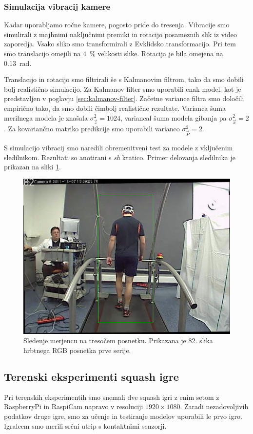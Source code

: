 \subsubsection{Simulacija vibracij kamere}
Kadar uporabljamo ročne kamere, pogosto pride do tresenja. Vibracije smo simulirali z majhnimi naključnimi premiki in rotacijo posameznih slik iz video zaporedja. Vsako sliko smo transformirali z Evklidsko transformacijo. Pri tem smo translacijo omejili na \SI{4}{\%} velikosti slike. Rotacija je bila omejena na \SI{0.13}{rad}. 

Translacijo in rotacijo smo filtrirali še s Kalmanovim filtrom, tako da smo dobili bolj realistično simulacijo. Za Kalmanov filter smo uporabili enak model, kot je predstavljen v poglavju \ref{sec:kalmanov-filter}. Začetne variance filtra smo določili empirično tako, da smo dobili čimbolj realistične rezultate. Varianca šuma merilnega modela je znašala $\sigma_\vec{z}^2=1024$, variancal šuma modela gibanja pa $\sigma_\vec{x}^2=2$. Za kovariančno matriko predikcije smo uporabili varianco $\sigma_\vec{P}^2=2$.

S simulacijo vibracij smo naredili obremenitveni test za modele z vključenim sledilnikom. Rezultati so anotirani s \textit{sh} kratico. Primer delovanja sledilnika je prikazan na sliki \ref{fig:vibracije}.

\begin{figure}[!htb]
	\centering
	\includegraphics[width=0.6\columnwidth]{./Slike/shake-bv-train-kcf2.png}
	\caption[Sledenje merjencu na tresočem posnetku]{Sledenje merjencu na tresočem posnetku. Prikazana je 82. slika hrbtnega RGB posnetka prve serije.}
	\label{fig:vibracije}
\end{figure} 








\subsection{Terenski eksperimenti squash igre}
Pri terenskih eksperimentih smo snemali dve squash igri z enim setom z RaspberryPi in RaspiCam napravo v resoluciji  $1920 \times 1080$. Zaradi nezadovoljivih podatkov druge igre, smo za učenje in testiranje modelov uporabili le prvo igro. Igralcem smo merili srčni utrip s kontaktnimi senzorji. 

